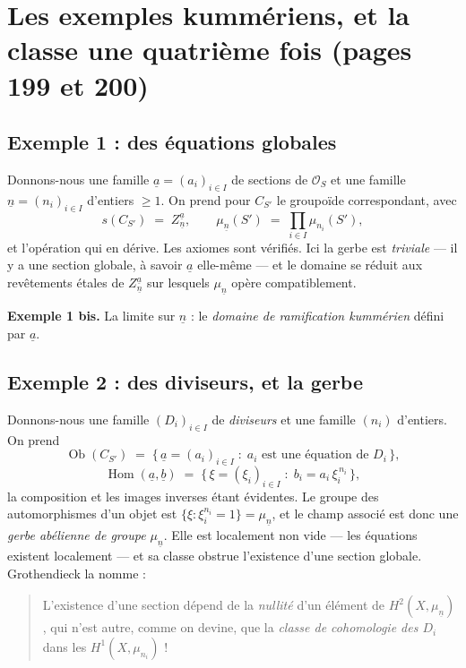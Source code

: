 \documentclass[11pt,a4paper]{article}
\begin{document}
\section*{Les exemples kummériens, et la classe une quatrième fois (pages 199 et 200)}

\subsection*{Exemple 1 : des équations globales}

Donnons-nous une famille $\underline{a} = (a_{i})_{i \in I}$ de sections de
$\mathcal{O}_{S}$ et une famille $\underline{n} = (n_{i})_{i \in I}$ d'entiers
$\geqslant 1$. On prend pour $C_{S'}$ le groupoïde correspondant, avec
\[
  s(C_{S'}) \;=\; Z^{\underline{a}}_{\underline{n}} , \qquad
  \mu_{\underline{n}}(S') \;=\; \prod_{i \in I} \mu_{n_{i}}(S') ,
\]
et l'opération qui en dérive. Les axiomes sont vérifiés. Ici la gerbe est
\emph{triviale} --- il y a une section globale, à savoir $\underline{a}$
elle-même --- et le domaine se réduit aux revêtements étales de
$Z^{\underline{a}}_{\underline{n}}$ sur lesquels $\mu_{\underline{n}}$ opère
compatiblement.

\textbf{Exemple 1 bis.} La limite sur $\underline{n}$ : le \emph{domaine de
ramification kummérien} défini par $\underline{a}$.

\subsection*{Exemple 2 : des diviseurs, et la gerbe}

Donnons-nous une famille $(D_{i})_{i \in I}$ de \emph{diviseurs} et une famille
$(n_{i})$ d'entiers. On prend
\[
  \operatorname{Ob}(C_{S'}) \;=\; \bigl\{\, \underline{a} = (a_{i})_{i \in I}
  \;:\; a_{i} \text{ est une équation de } D_{i} \,\bigr\} ,
\]
\[
  \operatorname{Hom}(\underline{a}, \underline{b}) \;=\;
  \bigl\{\, \xi = (\xi_{i})_{i \in I} \;:\; b_{i} = a_{i}\,\xi_{i}^{\,n_{i}}
  \,\bigr\} ,
\]
la composition et les images inverses étant évidentes. Le groupe des
automorphismes d'un objet est $\{\xi : \xi_{i}^{n_{i}} = 1\} =
\mu_{\underline{n}}$, et le champ associé est donc une \emph{gerbe abélienne de
groupe $\mu_{\underline{n}}$}. Elle est localement non vide --- les équations
existent localement --- et sa classe obstrue l'existence d'une section globale.
Grothendieck la nomme :

\begin{quote}
L'existence d'une section dépend de la \emph{nullité} d'un élément de
$H^{2}(X, \mu_{\underline{n}})$, qui n'est autre, comme on devine, que la
\emph{classe de cohomologie des $D_{i}$} dans les $H^{1}(X, \mu_{n_{i}})$ !
\end{quote}
\end{document}
